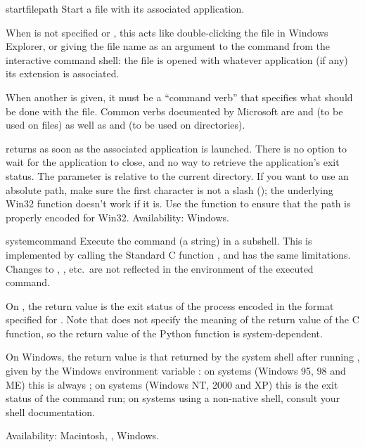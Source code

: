 \begin{funcdesc}{startfile}{path}
Start a file with its associated application.

When  is not specified or , this acts like
double-clicking the file in Windows Explorer, or giving the file name
as an argument to the  command from the interactive
command shell: the file is opened with whatever application (if any)
its extension is associated.

When another  is given, it must be a ``command verb''
that specifies what should be done with the file.
Common verbs documented by Microsoft are  and 
 (to be used on files) as well as  and
 (to be used on directories).

 returns as soon as the associated application
is launched.  There is no option to wait for the application to close,
and no way to retrieve the application's exit status.  The 
parameter is relative to the current directory.  If you want to use an
absolute path, make sure the first character is not a slash
(\character{/}); the underlying Win32 
function doesn't work if it is.  Use the 
function to ensure that the path is properly encoded for Win32.
Availability: Windows.
\end{funcdesc}

\begin{funcdesc}{system}{command}
Execute the command (a string) in a subshell.  This is implemented by
calling the Standard C function , and has the
same limitations.  Changes to , ,
etc.\ are not reflected in the environment of the executed command.

On \UNIX, the return value is the exit status of the process encoded in the
format specified for .  Note that \POSIX{} does not
specify the meaning of the return value of the C 
function, so the return value of the Python function is system-dependent.

On Windows, the return value is that returned by the system shell after
running , given by the Windows environment variable
: on  systems (Windows 95, 98 and ME)
this is always ; on  systems (Windows NT, 2000
and XP) this is the exit status of the command run; on systems using
a non-native shell, consult your shell documentation.

Availability: Macintosh, \UNIX, Windows.
\end{funcdesc}

